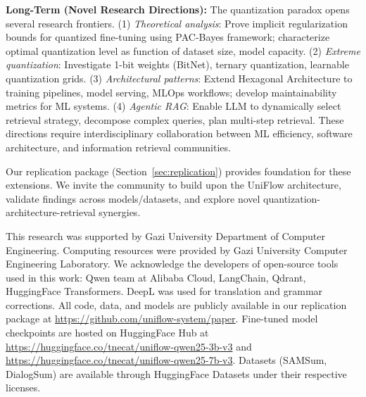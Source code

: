 \documentclass[pdflatex,sn-basic]{sn-jnl}
\begin{document}
\textbf{Long-Term (Novel Research Directions):} The quantization paradox opens several research frontiers. (1) \textit{Theoretical analysis}: Prove implicit regularization bounds for quantized fine-tuning using PAC-Bayes framework; characterize optimal quantization level as function of dataset size, model capacity. (2) \textit{Extreme quantization}: Investigate 1-bit weights (BitNet), ternary quantization, learnable quantization grids. (3) \textit{Architectural patterns}: Extend Hexagonal Architecture to training pipelines, model serving, MLOps workflows; develop maintainability metrics for ML systems. (4) \textit{Agentic RAG}: Enable LLM to dynamically select retrieval strategy, decompose complex queries, plan multi-step retrieval. These directions require interdisciplinary collaboration between ML efficiency, software architecture, and information retrieval communities.

Our replication package (Section~\ref{sec:replication}) provides foundation for these extensions. We invite the community to build upon the UniFlow architecture, validate findings across models/datasets, and explore novel quantization-architecture-retrieval synergies.

\backmatter


This research was supported by Gazi University Department of Computer Engineering. Computing resources were provided by Gazi University Computer Engineering Laboratory. We acknowledge the developers of open-source tools used in this work: Qwen team at Alibaba Cloud, LangChain, Qdrant, HuggingFace Transformers. DeepL was used for translation and grammar corrections.
All code, data, and models are publicly available in our replication package at \url{https://github.com/uniflow-system/paper}. Fine-tuned model checkpoints are hosted on HuggingFace Hub at \url{https://huggingface.co/tnecat/uniflow-qwen25-3b-v3} and \url{https://huggingface.co/tnecat/uniflow-qwen25-7b-v3}. Datasets (SAMSum, DialogSum) are available through HuggingFace Datasets under their respective licenses.
\end{document}
